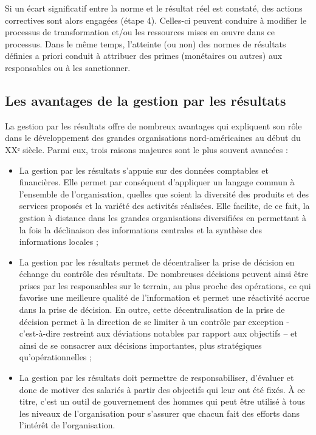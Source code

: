 \documentclass[oneside]{kaobook}
\begin{document}
Si un écart significatif entre la norme et le résultat réel est constaté, des actions correctives sont alors engagées (étape 4). Celles-ci peuvent conduire à modifier le processus de transformation et/ou les ressources mises en œuvre dans ce processus. Dans le même temps, l’atteinte (ou non) des normes de résultats définies a priori conduit à attribuer des primes (monétaires ou autres) aux responsables ou à les sanctionner.
\subsection{Les avantages de la gestion par les résultats}
\label{sec:orgbb7f4bd}
La gestion par les résultats offre de nombreux avantages qui expliquent son rôle dans le développement des grandes organisations nord-américaines au début du XXᵉ siècle. Parmi eux, trois raisons majeures sont le plus souvent avancées :
\begin{itemize}
\item La gestion par les résultats s’appuie sur des données comptables et financières. Elle permet par conséquent d’appliquer un langage commun à l’ensemble de l’organisation, quelles que soient la diversité des produits et des services proposés et la variété des activités réalisées. Elle facilite, de ce fait, la gestion à distance dans les grandes organisations diversifiées en permettant à la fois la déclinaison des informations centrales et la synthèse des informations locales ;
\item La gestion par les résultats permet de décentraliser la prise de décision en échange du contrôle des résultats. De nombreuses décisions peuvent ainsi être prises par les responsables sur le terrain, au plus proche des opérations, ce qui favorise une meilleure qualité de l’information et permet une réactivité accrue dans la prise de décision. En outre, cette décentralisation de la prise de décision permet à la direction de se limiter à un contrôle par exception - c’est-à-dire restreint aux déviations notables par rapport aux objectifs – et ainsi de se consacrer aux décisions importantes, plus stratégiques qu’opérationnelles ;
\item La gestion par les résultats doit permettre de responsabiliser, d’évaluer et donc de motiver des salariés à partir des objectifs qui leur ont été fixés. À ce titre, c’est un outil de gouvernement des hommes qui peut être utilisé à tous les niveaux de l’organisation pour s’assurer que chacun fait des efforts dans l’intérêt de l’organisation.
\end{itemize}
\end{document}
